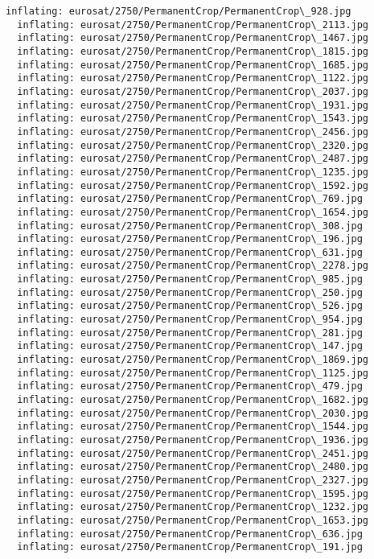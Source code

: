 \documentclass[11pt]{article}
\begin{document}
\begin{Verbatim}[commandchars=\\\{\}]
  inflating: eurosat/2750/PermanentCrop/PermanentCrop\_928.jpg
  inflating: eurosat/2750/PermanentCrop/PermanentCrop\_2113.jpg
  inflating: eurosat/2750/PermanentCrop/PermanentCrop\_1467.jpg
  inflating: eurosat/2750/PermanentCrop/PermanentCrop\_1815.jpg
  inflating: eurosat/2750/PermanentCrop/PermanentCrop\_1685.jpg
  inflating: eurosat/2750/PermanentCrop/PermanentCrop\_1122.jpg
  inflating: eurosat/2750/PermanentCrop/PermanentCrop\_2037.jpg
  inflating: eurosat/2750/PermanentCrop/PermanentCrop\_1931.jpg
  inflating: eurosat/2750/PermanentCrop/PermanentCrop\_1543.jpg
  inflating: eurosat/2750/PermanentCrop/PermanentCrop\_2456.jpg
  inflating: eurosat/2750/PermanentCrop/PermanentCrop\_2320.jpg
  inflating: eurosat/2750/PermanentCrop/PermanentCrop\_2487.jpg
  inflating: eurosat/2750/PermanentCrop/PermanentCrop\_1235.jpg
  inflating: eurosat/2750/PermanentCrop/PermanentCrop\_1592.jpg
  inflating: eurosat/2750/PermanentCrop/PermanentCrop\_769.jpg
  inflating: eurosat/2750/PermanentCrop/PermanentCrop\_1654.jpg
  inflating: eurosat/2750/PermanentCrop/PermanentCrop\_308.jpg
  inflating: eurosat/2750/PermanentCrop/PermanentCrop\_196.jpg
  inflating: eurosat/2750/PermanentCrop/PermanentCrop\_631.jpg
  inflating: eurosat/2750/PermanentCrop/PermanentCrop\_2278.jpg
  inflating: eurosat/2750/PermanentCrop/PermanentCrop\_985.jpg
  inflating: eurosat/2750/PermanentCrop/PermanentCrop\_250.jpg
  inflating: eurosat/2750/PermanentCrop/PermanentCrop\_526.jpg
  inflating: eurosat/2750/PermanentCrop/PermanentCrop\_954.jpg
  inflating: eurosat/2750/PermanentCrop/PermanentCrop\_281.jpg
  inflating: eurosat/2750/PermanentCrop/PermanentCrop\_147.jpg
  inflating: eurosat/2750/PermanentCrop/PermanentCrop\_1869.jpg
  inflating: eurosat/2750/PermanentCrop/PermanentCrop\_1125.jpg
  inflating: eurosat/2750/PermanentCrop/PermanentCrop\_479.jpg
  inflating: eurosat/2750/PermanentCrop/PermanentCrop\_1682.jpg
  inflating: eurosat/2750/PermanentCrop/PermanentCrop\_2030.jpg
  inflating: eurosat/2750/PermanentCrop/PermanentCrop\_1544.jpg
  inflating: eurosat/2750/PermanentCrop/PermanentCrop\_1936.jpg
  inflating: eurosat/2750/PermanentCrop/PermanentCrop\_2451.jpg
  inflating: eurosat/2750/PermanentCrop/PermanentCrop\_2480.jpg
  inflating: eurosat/2750/PermanentCrop/PermanentCrop\_2327.jpg
  inflating: eurosat/2750/PermanentCrop/PermanentCrop\_1595.jpg
  inflating: eurosat/2750/PermanentCrop/PermanentCrop\_1232.jpg
  inflating: eurosat/2750/PermanentCrop/PermanentCrop\_1653.jpg
  inflating: eurosat/2750/PermanentCrop/PermanentCrop\_636.jpg
  inflating: eurosat/2750/PermanentCrop/PermanentCrop\_191.jpg

\end{Verbatim}
\end{document}
